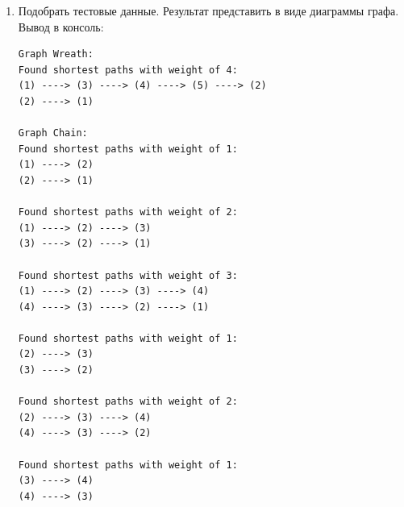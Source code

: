\documentclass[a4paper,14pt]{extarticle}
\begin{document}
\begin{enumerate}[1.]
\begin{verbatim}
    if (begin != end)
        printPath(graph, shortestWayMatrix, begin, shortestWayMatrix[begin][end].second, false);

    std::cout << "(" << graph.nodes[end]->name << ")";
    if (!isEnd)
        std::cout << " ----> ";
}

template<typename T>
void analyzeTree(T& g, std::string graphName) {
    std::cout << "Graph " << graphName << ":\n";
    auto shortestWayMatrix = g.getShortestWayMatrix();
    
    for (int i = 0; i < g.nodes.size(); i++) {
        for (int j = i + 1; j < g.nodes.size(); j++) {
            if (j == i) continue;

            // Пути должны существовать
            if (shortestWayMatrix[i][j].second == -1 || shortestWayMatrix[j][i].second == -1) continue;

            // Длина путей должна быть равна
            if (shortestWayMatrix[i][j].first != shortestWayMatrix[j][i].first) continue;
        
            std::cout << "Found shortest paths with weight of " << shortestWayMatrix[i][j].first << ":\n";
            printPath(g, shortestWayMatrix, i, j, true);
            std::cout << "\n";
            printPath(g, shortestWayMatrix, j, i, true);
            std::cout << "\n" << std::endl;
        }
    }
}
                \end{verbatim}
        \item Подобрать тестовые данные. Результат представить в виде диаграммы графа.\\
        Вывод в консоль:
                    \begin{verbatim}
Graph Wreath:
Found shortest paths with weight of 4:
(1) ----> (3) ----> (4) ----> (5) ----> (2)
(2) ----> (1)

Graph Chain:
Found shortest paths with weight of 1:
(1) ----> (2)
(2) ----> (1)

Found shortest paths with weight of 2:
(1) ----> (2) ----> (3)
(3) ----> (2) ----> (1)

Found shortest paths with weight of 3:
(1) ----> (2) ----> (3) ----> (4)
(4) ----> (3) ----> (2) ----> (1)

Found shortest paths with weight of 1:
(2) ----> (3)
(3) ----> (2)

Found shortest paths with weight of 2:
(2) ----> (3) ----> (4)
(4) ----> (3) ----> (2)

Found shortest paths with weight of 1:
(3) ----> (4)
(4) ----> (3)


\end{verbatim}
\end{enumerate}
\end{document}
